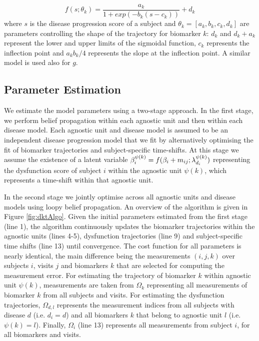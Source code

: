 \documentclass{llncs}
\begin{document}
\begin{equation}
 f(s;\theta_k) = \frac{a_k}{1+exp(-b_k(s-c_k))} + d_k
\end{equation}
where $s$ is the disease progression score of a subject and $\theta_k = [a_k, b_k, c_k, d_k]$ are parameters controlling the shape of the trajectory for biomarker $k$: $d_k$ and $d_k + a_k$ represent the lower and upper limits of the sigmoidal function, $c_k$ represents the inflection point and $a_k b_k/4$ represents the slope at the inflection point. A similar model is used also for $g$.


\subsection{Parameter Estimation}

\newcommand{\uu}{^{(u)}}
\newcommand{\um}{^{(u-1)}}

We estimate the model parameters using a two-stage approach. In the first stage, we perform belief propagation within each agnostic unit and then within each disease model. Each agnostic unit and disease model is assumed to be an independent disease progression model that we fit by alternatively optimising the fit of biomarker trajectories and subject-specific time-shifts. At this stage we assume the existence of a latent variable $\beta_i^{\psi(k)} = f(\beta_i + m_{ij}; \lambda_{d_i}^{\psi(k)})$ representing the dysfunction score of subject $i$ within the agnostic unit $\psi(k)$, which represents a time-shift within that agnostic unit.

In the second stage we jointly optimise across all agnostic units and disease models using loopy belief propagation. An overview of the algorithm is given in Figure \ref{fig:dktAlgo}. Given the initial parameters estimated from the first stage (line 1), the algorithm continuously updates the biomarker trajectories within the agnostic units (lines 4-5), dysfunction trajectories (line 9) and subject-specific time shifts (line 13) until convergence. The cost function for all parameters is nearly identical, the main difference being the measurements $(i,j,k)$ over subjects $i$, visits $j$ and biomarkers $k$ that are selected for computing the measurement error. For estimating the trajectory of biomarker $k$ within agnostic unit $\psi(k)$, measurements are taken from $\Omega_k$ representing all measurements of biomarker $k$ from all subjects and visits. For estimating the dysfunction trajectories, $\Omega_{d,l}$ represents the measurement indices from all subjects with disease $d$ (i.e. $d_i = d$) and all biomarkers $k$ that belong to agnostic unit $l$ (i.e. $\psi(k) = l$). Finally, $\Omega_i$ (line 13) represents all measurements from subject $i$, for all biomarkers and visits. 
\end{document}
